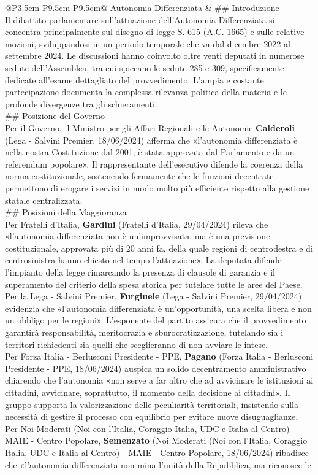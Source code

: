 \documentclass[a4paper,11pt]{article}
\begin{document}
\begin{landscape}
\begin{longtable}{@{}P{3.5cm} P{9.5cm} P{9.5cm}@{}}
Autonomia Differenziata & \#\# Introduzione\\[6pt] Il dibattito parlamentare sull'attuazione dell'Autonomia Differenziata si concentra principalmente sul disegno di legge S. 615 (A.C. 1665) e sulle relative mozioni, sviluppandosi in un periodo temporale che va dal dicembre 2022 al settembre 2024. Le discussioni hanno coinvolto oltre venti deputati in numerose sedute dell'Assemblea, tra cui spiccano le sedute 285 e 309, specificamente dedicate all'esame dettagliato del provvedimento. L'ampia e costante partecipazione documenta la complessa rilevanza politica della materia e le profonde divergenze tra gli schieramenti.\\[6pt] \#\# Posizione del Governo\\[6pt] Per il Governo, il Ministro per gli Affari Regionali e le Autonomie \textbf{Calderoli} (Lega - Salvini Premier, 18/06/2024) afferma che «l'autonomia differenziata è nella nostra Costituzione dal 2001; è stata approvata dal Parlamento e da un referendum popolare». Il rappresentante dell'esecutivo difende la coerenza della norma costituzionale, sostenendo fermamente che le funzioni decentrate permettono di erogare i servizi in modo molto più efficiente rispetto alla gestione statale centralizzata. \\[6pt] \#\# Posizioni della Maggioranza\\[6pt] Per Fratelli d'Italia, \textbf{Gardini} (Fratelli d'Italia, 29/04/2024) rileva che «l'autonomia differenziata non è un'improvvisata, ma è una previsione costituzionale, approvata più di 20 anni fa, della quale regioni di centrodestra e di centrosinistra hanno chiesto nel tempo l'attuazione». La deputata difende l'impianto della legge rimarcando la presenza di clausole di garanzia e il superamento del criterio della spesa storica per tutelare tutte le aree del Paese.\\[6pt] Per la Lega - Salvini Premier, \textbf{Furgiuele} (Lega - Salvini Premier, 29/04/2024) evidenzia che «l'autonomia differenziata è un'opportunità, una scelta libera e non un obbligo per le regioni». L'esponente del partito assicura che il provvedimento garantirà responsabilità, meritocrazia e sburocratizzazione, tutelando sia i territori richiedenti sia quelli che sceglieranno di non avviare le intese.\\[6pt] Per Forza Italia - Berlusconi Presidente - PPE, \textbf{Pagano} (Forza Italia - Berlusconi Presidente - PPE, 18/06/2024) auspica un solido decentramento amministrativo chiarendo che l'autonomia «non serve a far altro che ad avvicinare le istituzioni ai cittadini, avvicinare, soprattutto, il momento della decisione ai cittadini». Il gruppo supporta la valorizzazione delle peculiarità territoriali, insistendo sulla necessità di gestire il processo con equilibrio per evitare nuove disuguaglianze.\\[6pt] Per Noi Moderati (Noi con l'Italia, Coraggio Italia, UDC e Italia al Centro) - MAIE - Centro Popolare, \textbf{Semenzato} (Noi Moderati (Noi con l'Italia, Coraggio Italia, UDC e Italia al Centro) - MAIE - Centro Popolare, 18/06/2024) ribadisce che «l'autonomia differenziata non mina l'unità della Repubblica, ma riconosce le 
\end{longtable}
\end{landscape}
\end{document}
